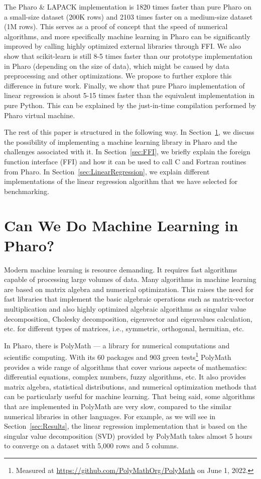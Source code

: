\documentclass[]{ceurart}
\begin{document}
The Pharo \& LAPACK implementation is 1820 times faster than pure Pharo on a small-size dataset (200K rows) and 2103 times faster on a medium-size dataset (1M rows).
This serves as a proof of concept that the speed of numerical algorithms, and more specifically machine learning in Pharo can be significantly improved by calling highly optimized external libraries through FFI.
We also show that scikit-learn is still 8-5 times faster than our prototype implementation in Pharo (depending on the size of data), which might be caused by data preprocessing and other optimizations.
We propose to further explore this difference in future work.
Finally, we show that pure Pharo implementation of linear regression is about 5-15 times faster than the equivalent implementation in pure Python.
This can be explained by the just-in-time compilation performed by Pharo virtual machine.

The rest of this paper is structured in the following way.
In Section~\ref{sec:Problem}, we discuss the possibility of implementing a machine learning library in Pharo and the challenges associated with it.
In Section~\ref{sec:FFI}, we briefly explain the foreign function interface (FFI) and how it can be used to call C and Fortran routines from Pharo.
In Section~\ref{sec:LinearRegression}, we explain different implementations of the linear regression algorithm that we have selected for benchmarking.



\section{Can We Do Machine Learning in Pharo?}
\label{sec:Problem}

Modern machine learning is resource demanding.
It requires fast algorithms capable of processing large volumes of data.
Many algorithms in machine learning are based on matrix algebra and numerical optimization.
This raises the need for fast libraries that implement the basic algebraic operations such as matrix-vector multiplication and also highly optimized algebraic algorithms as singular value decomposition, Cholesky decomposition, eigenvector and eigenvalues calculation, etc. for different types of matrices, i.e., symmetric, orthogonal, hermitian, etc.

In Pharo, there is PolyMath --- a library for numerical computations and scientific computing.
With its 60 packages and 903 green tests\footnote{Measured at \url{https://github.com/PolyMathOrg/PolyMath} on June 1, 2022.} PolyMath provides a wide range of algorithms that cover various aspects of mathematics: differential equations, complex numbers, fuzzy algorithms, etc.
It also provides matrix algebra, statistical distributions, and numerical optimization methods that can be particularly useful for machine learning.
That being said, some algorithms that are implemented in PolyMath are very slow, compared to the similar numerical libraries in other languages.
For example, as we will see in Section~\ref{sec:Results}, the linear regression implementation that is based on the singular value decomposition (SVD) provided by PolyMath takes almost 5 hours to converge on a dataset with 5,000 rows and 5 columns.
\end{document}
